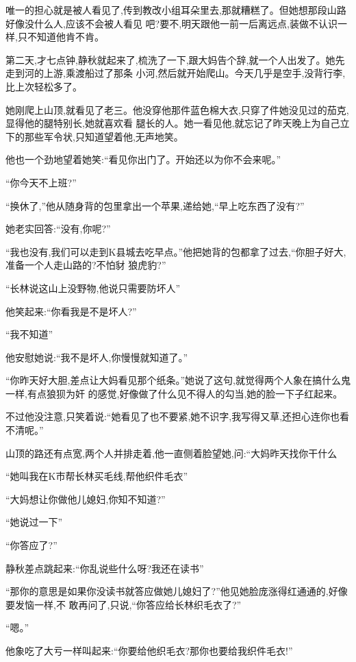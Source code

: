 ﻿\documentclass[12pt]{article}
\begin{document}
唯一的担心就是被人看见了,传到教改小组耳朵里去,那就糟糕了。但她想那段山路好像没什么人,应该不会被人看见
吧?要不,明天跟他一前一后离远点,装做不认识一样,只不知道他肯不肯。

第二天,才七点钟,静秋就起来了,梳洗了一下,跟大妈告个辞,就一个人出发了。她先走到河的上游,乘渡船过了那条
小河,然后就开始爬山。今天几乎是空手,没背行李,比上次轻松多了。

她刚爬上山顶,就看见了老三。他没穿他那件蓝色棉大衣,只穿了件她没见过的茄克,显得他的腿特别长,她就喜欢看
腿长的人。她一看见他,就忘记了昨天晚上为自己立下的那些军令状,只知道望着他,无声地笑。

他也一个劲地望着她笑:``看见你出门了。开始还以为你不会来呢。''

``你\myrule 今天不上班?''

``换休了,''他从随身背的包里拿出一个苹果,递给她,``早上吃东西了没有?''

她老实回答:``没有,你呢?''

``我也没有,我们可以走到K县城去吃早点。''他把她背的包都拿了过去,``你胆子好大,准备一个人走山路的?不怕豺
狼虎豹?''

``长林说这山上没野物\myrule ,他说\myrule 只需要防坏人\myrule ''

他笑起来:``你看我是不是坏人?''

``我不知道\myrule ''

他安慰她说:``我不是坏人,你慢慢就知道了。''

``你昨天\myrule 好大胆,差点让大妈看见那个纸条。''她说了这句,就觉得两个人象在搞什么鬼一样,有点狼狈为奸
的感觉,好像做了什么见不得人的勾当,她的脸一下子红起来。

不过他没注意,只笑着说:``她看见了也不要紧,她不识字,我写得又草,还担心连你也看不清呢。''

山顶的路还有点宽,两个人并排走着,他一直侧着脸望她,问:``大妈昨天找你干什么

``她叫我在K市帮长林买毛线,帮他织件毛衣\myrule ''

``大妈想让你做他儿媳妇,你知不知道?''

``她\myrule 说过一下\myrule ''

``你\myrule 答应了?''

静秋差点跳起来:``你乱说些什么呀?我还在读书\myrule ''

``那你的意思是\myrule 如果你没读书\myrule 就答应做她儿媳妇了?''他见她脸庞涨得红通通的,好像要发恼一样,不
敢再问了,只说,``你\myrule 答应给长林\myrule 织毛衣了?''

``嗯。''

他象吃了大亏一样叫起来:``你要给他织毛衣?那你也要给我织件毛衣!''
\end{document}
